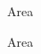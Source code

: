 \documentclass[a4paper]{article}
\begin{document}
\printVSLEventHeader{}{}
\begin{center}
\begin{vsltext}{3cm}{3.5cm}
Area \AreaA

\vspace{3cm}

Area \AreaB
\end{vsltext}

\end{center}
\end{document}

